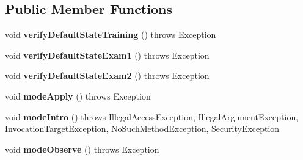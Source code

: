 \subsection*{Public Member Functions}
\begin{DoxyCompactItemize}
\item 
\hypertarget{classcom_1_1zeuslearning_1_1automation_1_1unittests_1_1Cengage__4844_aeb88f4fe91199563ad5568261bc4a002}{}\label{classcom_1_1zeuslearning_1_1automation_1_1unittests_1_1Cengage__4844_aeb88f4fe91199563ad5568261bc4a002} 
void {\bfseries verify\+Default\+State\+Training} ()  throws Exception     
\item 
\hypertarget{classcom_1_1zeuslearning_1_1automation_1_1unittests_1_1Cengage__4844_afb9ffc1aed553f0543d82734ebacc4cd}{}\label{classcom_1_1zeuslearning_1_1automation_1_1unittests_1_1Cengage__4844_afb9ffc1aed553f0543d82734ebacc4cd} 
void {\bfseries verify\+Default\+State\+Exam1} ()  throws Exception     
\item 
\hypertarget{classcom_1_1zeuslearning_1_1automation_1_1unittests_1_1Cengage__4844_a80187cc5a3023d7b45e00ddd9ab43dff}{}\label{classcom_1_1zeuslearning_1_1automation_1_1unittests_1_1Cengage__4844_a80187cc5a3023d7b45e00ddd9ab43dff} 
void {\bfseries verify\+Default\+State\+Exam2} ()  throws Exception     
\item 
\hypertarget{classcom_1_1zeuslearning_1_1automation_1_1unittests_1_1Cengage__4844_a580d9b4280a3b1d77a0eda66787a41cd}{}\label{classcom_1_1zeuslearning_1_1automation_1_1unittests_1_1Cengage__4844_a580d9b4280a3b1d77a0eda66787a41cd} 
void {\bfseries mode\+Apply} ()  throws Exception     
\item 
\hypertarget{classcom_1_1zeuslearning_1_1automation_1_1unittests_1_1Cengage__4844_ab544815a78970c538fcfd4755b6e8595}{}\label{classcom_1_1zeuslearning_1_1automation_1_1unittests_1_1Cengage__4844_ab544815a78970c538fcfd4755b6e8595} 
void {\bfseries mode\+Intro} ()  throws Illegal\+Access\+Exception, Illegal\+Argument\+Exception, Invocation\+Target\+Exception, No\+Such\+Method\+Exception, Security\+Exception     
\item 
\hypertarget{classcom_1_1zeuslearning_1_1automation_1_1unittests_1_1Cengage__4844_a488da0677d3b7f30b4ecb60c9be3d38e}{}\label{classcom_1_1zeuslearning_1_1automation_1_1unittests_1_1Cengage__4844_a488da0677d3b7f30b4ecb60c9be3d38e} 
void {\bfseries mode\+Observe} ()  throws Exception     
\item 
\hypertarget{classcom_1_1zeuslearning_1_1automation_1_1unittests_1_1Cengage__4844_abcd8c0d2d4c637cde078362656eebbbd}{}\label{classcom_1_1zeuslearning_1_1automation_1_1unittests_1_1Cengage__4844_abcd8c0d2d4c637cde078362656eebbbd} 

\end{DoxyCompactItemize}
